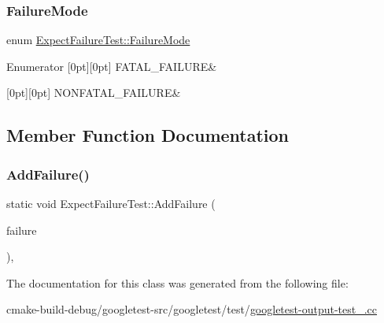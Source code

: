 \subsubsection{\texorpdfstring{FailureMode}{FailureMode}}
{\footnotesize\ttfamily enum \mbox{\hyperlink{classExpectFailureTest_aad05da10bb15d21a434eba3b37011406}{Expect\+Failure\+Test\+::\+Failure\+Mode}}}

\begin{DoxyEnumFields}{Enumerator}
[0pt][0pt]{}\mbox{\label{classExpectFailureTest_aad05da10bb15d21a434eba3b37011406a3d618496b7e2a2c256e02186bddee4ec}} 
F\+A\+T\+A\+L\+\_\+\+F\+A\+I\+L\+U\+RE&\\
\hline

[0pt][0pt]{}\mbox{\label{classExpectFailureTest_aad05da10bb15d21a434eba3b37011406aeabdbecc0c4550d4f46cd44ac62fb92b}} 
N\+O\+N\+F\+A\+T\+A\+L\+\_\+\+F\+A\+I\+L\+U\+RE&\\
\hline

\end{DoxyEnumFields}


\subsection{Member Function Documentation}
\mbox{\label{classExpectFailureTest_ab9aeb7820ff7953fc2975ecc5abd046b}} 
\subsubsection{\texorpdfstring{AddFailure()}{AddFailure()}}
{\footnotesize\ttfamily static void Expect\+Failure\+Test\+::\+Add\+Failure (\begin{DoxyParamCaption}\item[{\mbox{\hyperlink{classExpectFailureTest_aad05da10bb15d21a434eba3b37011406}{Failure\+Mode}}}]{failure }\end{DoxyParamCaption})\hspace{0.3cm}{\ttfamily [inline]}, {\ttfamily [static]}}



The documentation for this class was generated from the following file\+:\begin{DoxyCompactItemize}
\item 
cmake-\/build-\/debug/googletest-\/src/googletest/test/\mbox{\hyperlink{googletest-output-test___8cc}{googletest-\/output-\/test\+\_\+.\+cc}}\end{DoxyCompactItemize}
